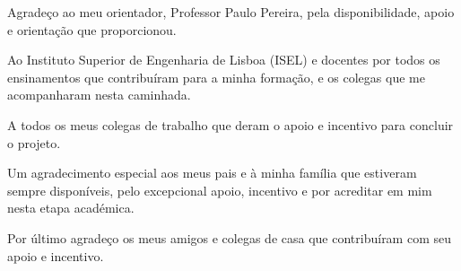 \acknowledgements

Agradeço ao meu orientador, Professor Paulo Pereira, pela disponibilidade, apoio e orientação que proporcionou.

Ao Instituto Superior de Engenharia de Lisboa (ISEL) e docentes por todos os ensinamentos que contribuíram para a minha formação, e os colegas que me acompanharam nesta caminhada. 

A todos os meus colegas de trabalho que deram o apoio e incentivo para concluir o projeto.

Um agradecimento especial aos meus pais e à minha família que estiveram sempre disponíveis, pelo excepcional apoio, incentivo e por acreditar em mim nesta etapa académica.

Por último agradeço os meus amigos e colegas de casa que contribuíram com seu apoio e incentivo.
